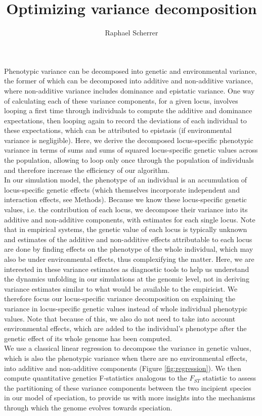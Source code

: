 \documentclass[]{article}
\title{Optimizing variance decomposition}
\author{Raphael Scherrer}
\begin{document}
\maketitle

Phenotypic variance can be decomposed into genetic and environmental variance, the former of which can be decomposed into additive and non-additive variance, where non-additive variance includes dominance and epistatic variance. One way of calculating each of these variance components, for a given locus, involves looping a first time through individuals to compute the additive and dominance expectations, then looping again to record the deviations of each individual to these expectations, which can be attributed to epistasis (if environmental variance is negligible). Here, we derive the decomposed locus-specific phenotypic variance in terms of sums and sums of squared locus-specific genetic values across the population, allowing to loop only once through the population of individuals and therefore increase the efficiency of our algorithm.\\

In our simulation model, the phenotype of an individual is an accumulation of locus-specific genetic effects (which themselves incorporate independent and interaction effects, see Methods). Because we know these locus-specific genetic values, i.e. the contribution of each locus, we decompose their variance into its additive and non-additive components, with estimates for each single locus. Note that in empirical systems, the genetic value of each locus is typically unknown and estimates of the additive and non-additive effects attributable to each locus are done by finding effects on the phenotype of the whole individual, which may also be under environmental effects, thus complexifying the matter. Here, we are interested in these variance estimates as diagnostic tools to help us understand the dynamics unfolding in our simulations at the genomic level, not in deriving variance estimates similar to what would be available to the empiricist. We therefore focus our locus-specific variance decomposition on explaining the variance in locus-specific genetic values instead of whole individual phenotypic values. Note that because of this, we also do not need to take into account environmental effects, which are added to the individual's phenotype after the genetic effect of its whole genome has been computed.\\

We use a classical linear regression to decompose the variance in genetic values, which is also the phenotypic variance when there are no environmental effects, into additive and non-additive components (Figure \ref{fig:regression}). We then compute quantitative genetics F-statistics analogous to the $F_{ST}$ statistic to assess the partitioning of these variance components between the two incipient species in our model of speciation, to provide us with more insights into the mechanisms through which the genome evolves towards speciation.\\
\end{document}
